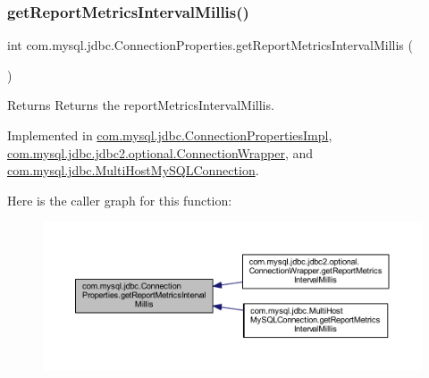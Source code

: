 \subsubsection{\texorpdfstring{get\+Report\+Metrics\+Interval\+Millis()}{getReportMetricsIntervalMillis()}}
{\footnotesize\ttfamily int com.\+mysql.\+jdbc.\+Connection\+Properties.\+get\+Report\+Metrics\+Interval\+Millis (\begin{DoxyParamCaption}{ }\end{DoxyParamCaption})}

\begin{DoxyReturn}{Returns}
Returns the report\+Metrics\+Interval\+Millis. 
\end{DoxyReturn}


Implemented in \mbox{\hyperlink{classcom_1_1mysql_1_1jdbc_1_1_connection_properties_impl_a4edd40bce78479f65769de2f31a13efc}{com.\+mysql.\+jdbc.\+Connection\+Properties\+Impl}}, \mbox{\hyperlink{classcom_1_1mysql_1_1jdbc_1_1jdbc2_1_1optional_1_1_connection_wrapper_a5f6c8e0cebe816e8612a1b3bdd418e3e}{com.\+mysql.\+jdbc.\+jdbc2.\+optional.\+Connection\+Wrapper}}, and \mbox{\hyperlink{classcom_1_1mysql_1_1jdbc_1_1_multi_host_my_s_q_l_connection_a8b847e33c04c41470b7ee6e10dafa60f}{com.\+mysql.\+jdbc.\+Multi\+Host\+My\+S\+Q\+L\+Connection}}.

Here is the caller graph for this function\+:\nopagebreak
\begin{figure}[H]
\begin{center}
\leavevmode
\includegraphics[width=350pt]{interfacecom_1_1mysql_1_1jdbc_1_1_connection_properties_aac4f74c781305ad6b2eb71913e184de3_icgraph}
\end{center}
\end{figure}
\mbox{\label{interfacecom_1_1mysql_1_1jdbc_1_1_connection_properties_a8b670aa700956797a853c145974cd285}} 
